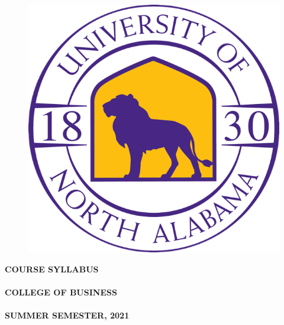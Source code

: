 \documentclass[12pt]{letter}
\newlength{\logowidth}
\newcommand{\customhref}[2]{
	\href{#1}{\color{blue}\burl{#2}}	
}
\newcommand{\semester}{SUMMER SEMESTER, 2021}
\begin{document}
\thispagestyle{empty}


\begin{large}


\begin{figure}
 \includegraphics[width=\logowidth]{img/approved_una_logo}
\end{figure}

\textbf{COURSE SYLLABUS}\\ \\
\textbf{COLLEGE OF BUSINESS}\\ \\
\textbf{\semester}
 
  \vspace*{28pt}
  \textbf{\course} \\ \\ 
  \textbf{\coursetitle}
\end{large}
\end{document}
